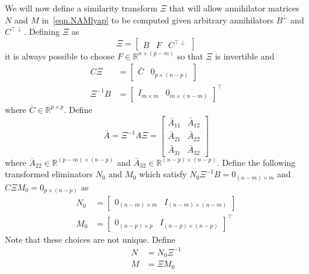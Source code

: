 \documentclass[]{../sty/aiaa-tc}
\begin{document}
  We will now define a similarity transform $\Xi$ that will allow annihilator matrices $N$ and $M$ in\ \eqref{eqn.NAMlyap} to be computed given arbitrary annihilators $B^{\perp}$ and $C^{\top\perp}$.
  Defining $\Xi$ as\cite{owens.invariant.1977}
  \begin{equation}
    \label{eqn.Xi}
    \Xi=
    \begin{bmatrix}
      B & F & C^{\top\perp}
    \end{bmatrix}
  \end{equation}
  it is always possible to choose $F\in\mathbb{R}^{n\times(p-m)}$ so that $\Xi$ is invertible and
  \begin{align*}
    C\Xi&=
    \begin{bmatrix}
      \bar{C} & 0_{p\times(n-p)}
    \end{bmatrix} \\
    \Xi^{-1}B&=
    \begin{bmatrix}
      I_{m\times m} & 0_{m\times(n-m)}
    \end{bmatrix}^{\top}
  \end{align*}
  where $\bar{C}\in\mathbb{R}^{p\times p}$.
  Define
  \begin{equation}
    \label{eqn.Abar}
    \bar{A}=\Xi^{-1}A\Xi=
    \left[
    \begin{array}{c|c} %
      \bar{A}_{11} & \bar{A}_{12} \\
      \hline %
      \bar{A}_{21} & \bar{A}_{22} \\
      \hline %
      \bar{A}_{31} & \bar{A}_{32}
    \end{array}\right]
  \end{equation}
  where $\bar{A}_{22}\in\mathbb{R}^{(p-m)\times(n-p)}$ and $\bar{A}_{32}\in\mathbb{R}^{(n-p)\times(n-p)}$.
  Define the following transformed eliminators $N_{0}$ and $M_{0}$ which satisfy $N_{0}\Xi^{-1}B=0_{(n-m)\times m}$ and $C\Xi M_{0}=0_{p\times(n-p)}$ as
  \begin{align}
    \label{eqn.N0}
    N_{0}&=
    \begin{bmatrix}
      0_{(n-m)\times m} & I_{(n-m)\times(n-m)}
    \end{bmatrix} \\
    \label{eqn.M0}
    M_{0}&=
    \begin{bmatrix}
      0_{(n-p)\times p} & I_{(n-p)\times(n-p)}
    \end{bmatrix}^{\top}
  \end{align}
  Note that these choices are not unique.
  Define
  \begin{align}
    \label{eqn.N}
    N&=N_{0}\Xi^{-1} \\
    \label{eqn.M}
    M&=\Xi M_{0}
  \end{align}
\end{document}
